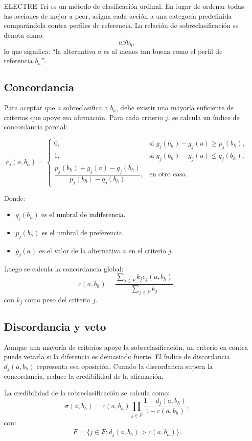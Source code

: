 \documentclass[11pt,a4paper]{article}
\begin{document}
ELECTRE Tri es un método de clasificación ordinal. En lugar de ordenar todas las acciones de mejor a peor, asigna cada acción a una categoría predefinida comparándola contra perfiles de referencia. La relación de sobreclasificación se denota como:
\[
a S b_h,
\]
lo que significa: ``la alternativa $a$ es al menos tan buena como el perfil de referencia $b_h$''.

\subsection{Concordancia}

Para aceptar que $a$ sobreclasifica a $b_h$, debe existir una mayoría suficiente de criterios que apoye esa afirmación. Para cada criterio $j$, se calcula un índice de concordancia parcial:

\[
c_j(a,b_h)=
\begin{cases}
0, & \text{si } g_j(b_h)-g_j(a) \geq p_j(b_h),\\[4pt]
1, & \text{si } g_j(b_h)-g_j(a) \leq q_j(b_h),\\[4pt]
\dfrac{p_j(b_h)+g_j(a)-g_j(b_h)}{p_j(b_h)-q_j(b_h)}, & \text{en otro caso.}
\end{cases}
\]

Donde:
\begin{itemize}[leftmargin=*]
    \item $q_j(b_h)$ es el umbral de indiferencia.
    \item $p_j(b_h)$ es el umbral de preferencia.
    \item $g_j(a)$ es el valor de la alternativa $a$ en el criterio $j$.
\end{itemize}

Luego se calcula la concordancia global:
\[
c(a,b_h)=\frac{\sum_{j \in F} k_j c_j(a,b_h)}{\sum_{j \in F} k_j},
\]
con $k_j$ como peso del criterio $j$.

\subsection{Discordancia y veto}

Aunque una mayoría de criterios apoye la sobreclasificación, un criterio en contra puede vetarla si la diferencia es demasiado fuerte. El índice de discordancia $d_j(a,b_h)$ representa esa oposición. Cuando la discordancia supera la concordancia, reduce la credibilidad de la afirmación.

La credibilidad de la sobreclasificación se calcula como:
\[
\sigma(a,b_h)=c(a,b_h)\prod_{j\in \bar{F}}\frac{1-d_j(a,b_h)}{1-c(a,b_h)},
\]
con:
\[
\bar{F}=\{j\in F: d_j(a,b_h)>c(a,b_h)\}.
\]
\end{document}
